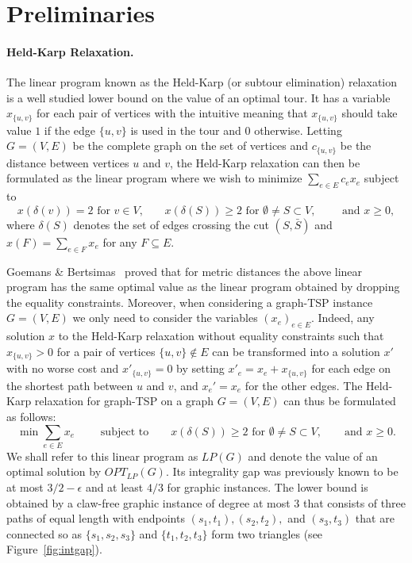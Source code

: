 \documentclass[letterpaper,11pt]{article}
\newcommand{\LP}[1]{\ensuremath{LP(#1)}}
\newcommand{\OLP}[1]{\ensuremath{OPT_{LP}(#1)}}
\newcommand{\TSP}{graph-TSP\xspace}
\begin{document}
\section{Preliminaries}\label{sec:prelim}
    \vspace{-0.1cm}
    \paragraph{Held-Karp Relaxation.} The linear program known as the
    Held-Karp (or subtour elimination) relaxation is a well studied lower
    bound on the value of an optimal tour. It has a variable $x_{\{u,v\}}$
    for each pair of vertices with the intuitive meaning that
    $x_{\{u,v\}}$ should take value $1$ if the edge $\{u,v\}$ is used in
    the tour and $0$ otherwise. Letting $G=(V,E)$ be the complete graph on
    the set of vertices and $c_{\{u,v\}}$ be the distance between vertices
    $u$ and $v$, the Held-Karp relaxation can then be formulated as the
    linear program where we wish to  minimize $\sum_{e \in E} c_{e} x_{e}$ subject to
$$  x(\delta(v)) =
      2 \mbox{    for }v\in V  \mbox{,}  \qquad x(\delta(S)) \geq 2 \mbox{   for } \emptyset \neq S \subset V, \qquad \mbox{ and $x\geq 0$},
    $$
    where $\delta(S)$ denotes the set of edges crossing the cut $(S, \bar S)$ and
    $x(F) = \sum_{e\in F} x_e$ for any $F\subseteq E$.

    Goemans \& Bertsimas~\cite{GB90} proved that for metric distances the
    above linear program has the same optimal value as the linear program
    obtained by dropping the equality constraints. Moreover, when
    considering a \TSP instance $G=(V,E)$ we only need to consider the
    variables $(x_{e})_{e\in E}$. Indeed, any solution $x$ to the
    Held-Karp relaxation without equality constraints such that $x_{\{u,v\}}>0$
    for a pair of vertices $\{u,v\} \not \in E$ can be transformed into a
    solution $x'$ with no worse cost and $x'_{\{u,v\}} = 0$ by setting
    $x'_{e} = x_{e} + x_{\{u,v\}}$ for each edge on the shortest path
    between $u$ and $v$, and $x_e' = x_e$ for the 
    other edges.  The Held-Karp relaxation for \TSP on a graph $G=(V,E)$
    can thus be formulated as follows:
    $$
     \min \sum_{e \in E} x_{e} \qquad \mbox{ subject to}
    \qquad x(\delta(S)) \geq 2 \mbox{ for } \emptyset \neq S \subset V,\qquad \mbox{and } x\geq 0.
    $$
    We shall refer to this linear program as \LP{G} and denote the value
    of an optimal solution by \OLP{G}.  Its integrality gap was previously known to
    be at most $3/2- \epsilon$ and at least $4/3$ for graphic instances.
The lower bound
    is obtained by a claw-free graphic instance of degree at most $3$ that
    consists of three paths of equal length with endpoints $(s_1, t_1),
    (s_2, t_2),$ and $(s_3,t_3)$ that are connected so as $\{s_1, s_2,
    s_3\}$ and $\{t_1, t_2, t_3\}$ form two triangles (see Figure~\ref{fig:intgap}).
\end{document}

